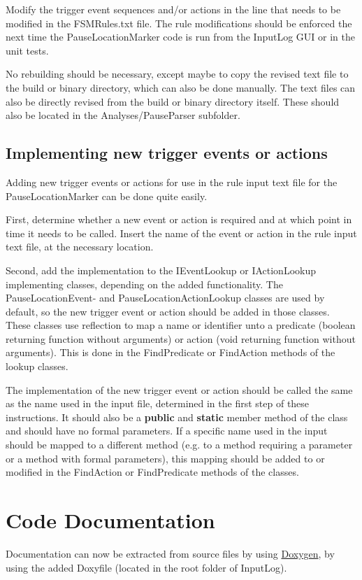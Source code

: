 \documentclass[a4paper,11pt]{report}
\begin{document}
			Modify the trigger event sequences and/or actions in the line that needs to be modified in the FSMRules.txt file. The rule modifications should be enforced the next time the PauseLocationMarker code is run from the InputLog GUI or in the unit tests.
			
			No rebuilding should be necessary, except maybe to copy the revised text file to the build or binary directory, which can also be done manually. The text files can also be directly revised from the build or binary directory itself. These should also be located in the Analyses/PauseParser subfolder.
			
	\subsection{Implementing new trigger events or actions}
	
		Adding new trigger events or actions for use in the rule input text file for the PauseLocationMarker can be done quite easily.
		
		First, determine whether a new event or action is required and at which point in time it needs to be called. Insert the name of the event or action in the rule input text file, at the necessary location.
		
		
		Second, add the implementation to the IEventLookup or IActionLookup implementing classes, depending on the added functionality. The PauseLocationEvent- and PauseLocationActionLookup classes are used by default, so the new trigger event or action should be added in those classes.
		These classes use reflection to map a name or identifier unto a predicate (boolean returning function without arguments) or action (void returning function without arguments). This is done in the FindPredicate or FindAction methods of the lookup classes.
		
		The implementation of the new trigger event or action should be called the same as the name used in the input file, determined in the first step of these instructions. It should also be a \textbf{public} and \textbf{static} member method of the class and should have no formal parameters.
		If a specific name used in the input should be mapped to a different method (e.g. to a method requiring a parameter or a method with formal parameters), this mapping should be added to or modified in the FindAction or FindPredicate methods of the classes.

		

\section{Code Documentation}
	Documentation can now be extracted from source files by using \href{http://www.doxygen.org}{Doxygen}, by using the added Doxyfile (located in the root folder of InputLog).
	
\end{document}
